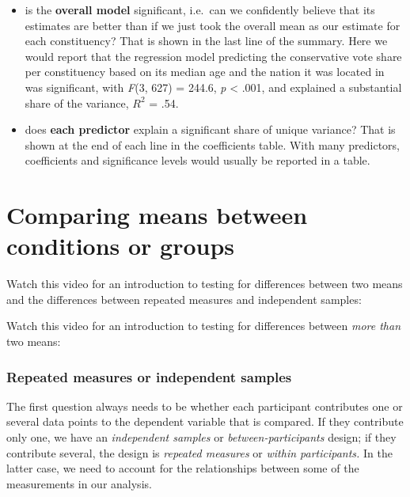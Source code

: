 \documentclass[
]{book}
\providecommand{\tightlist}{%
  \setlength{\itemsep}{0pt}\setlength{\parskip}{0pt}}
\begin{document}
\begin{itemize}
\tightlist
\item
  is the \textbf{overall model} significant, i.e.~can we confidently
  believe that its estimates are better than if we just took the
  overall mean as our estimate for each constituency? That is shown in
  the last line of the summary. Here we would report that the
  regression model predicting the conservative vote share per
  constituency based on its median age and the nation it was located
  in was significant, with \emph{F}(3, 627) = 244.6, \emph{p} \textless{} .001, and
  explained a substantial share of the variance, \(R^2\) = .54.
\item
  does \textbf{each predictor} explain a significant share of unique
  variance? That is shown at the end of each line in the coefficients
  table. With many predictors, coefficients and significance levels
  would usually be reported in a table.
\end{itemize}

\hypertarget{comparing-means-between-conditions-or-groups}{%
\chapter{Comparing means between conditions or groups}\label{comparing-means-between-conditions-or-groups}}

Watch this video for an introduction to testing for differences between two means and the differences between repeated measures and independent samples:

Watch this video for an introduction to testing for differences between \emph{more than} two means:

\hypertarget{repeated-measures-or-independent-samples}{%
\subsection{Repeated measures or independent samples}\label{repeated-measures-or-independent-samples}}

The first question always needs to be whether each participant contributes one or several data points to the dependent variable that is compared. If they contribute only one, we have an \emph{independent samples} or \emph{between-participants} design; if they contribute several, the design is \emph{repeated measures} or \emph{within participants.} In the latter case, we need to account for the relationships between some of the measurements in our analysis.
\end{document}
